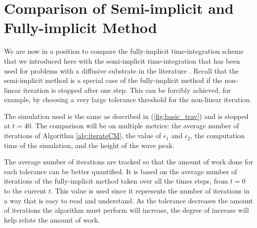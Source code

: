 \section{Comparison of Semi-implicit and Fully-implicit Method}
We are now in a position to compare the fully-implicit time-integration scheme that we introduced here with the semi-implicit time-integration that has been used for problems with a diffusive substrate in the literature \citep{khassehkhan2009nonlinearMaster}.
Recall that the semi-implicit method is a special case of the fully-implicit method if the non-linear iteration is stopped after one step.
This can be forcibly achieved, for example, by choosing a very large tolerance threshold for the non-linear iteration.

The simulation used is the same as described in (\ref{fig:basic_trav}) and is stopped at $t = 40$.
The comparison will be on multiple metrics: the average number of iterations of Algorithm \ref{alg:iterateCM}, the value of $\epsilon_1$ and $\epsilon_2$, the computation time of the simulation, and the height of the wave peak.

  

The average number of iterations are tracked so that the amount of work done for each tolerance can be better quantified.
It is based on the average number of iterations of the fully-implicit method taken over all the times steps, from $t=0$ to the current $t$. 
This value is used since it represents the number of iterations in a way that is easy to read and understand.
As the tolerance decreases the amount of iterations the algorithm must perform will increase, the degree of increase will help relate the amount of work.

